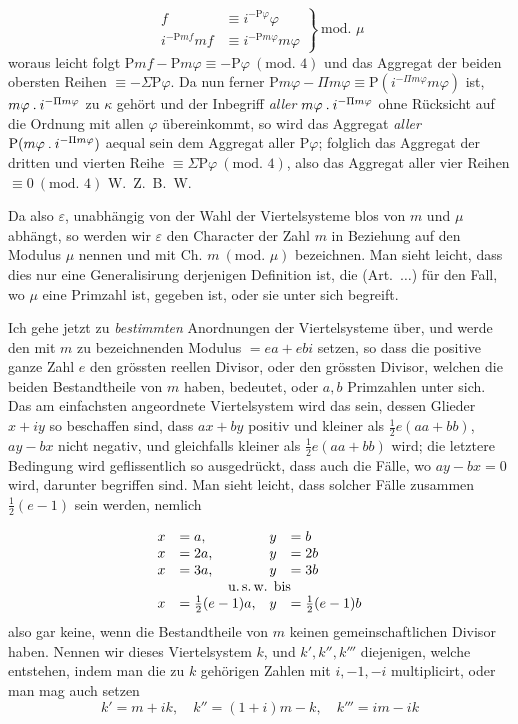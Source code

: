 %
\[
\left.\begin{aligned}
f&\equiv i^{-\mathrm{P}\varphi}\varphi\\
i^{-\mathrm{P}mf}mf&\equiv i^{-\mathrm{P}m\varphi}m\varphi
\end{aligned}\right\}\ \text{mod. }\mu
\]
woraus leicht folgt $\mathrm{P}mf-\mathrm{P}m\varphi\equiv-\mathrm{P}\varphi\ (\text{mod. }4)$ und das Aggregat der beiden obersten Reihen $\equiv-\Sigma\mathrm{P}\varphi$. Da nun ferner $\mathrm{P}m\varphi-\Pi m\varphi\equiv\mathrm{P}(i^{-\Pi m\varphi}m\varphi)$ ist, $m\varphi\mathbin{.} i^{-\Pi m\varphi}$ zu $\kappa$ gehört und der Inbegriff \emph{aller} $m\varphi\mathbin{.} i^{-\Pi m\varphi}$ ohne Rücksicht auf die Ordnung mit allen $\varphi$ übereinkommt, so wird das Aggregat \emph{aller} $\mathrm{P}(m\varphi\mathbin{.} i^{-\Pi m\varphi})$ aequal sein dem Aggregat aller $\mathrm{P}\varphi$; folglich das Aggregat der dritten und vierten Reihe $\equiv\Sigma\mathrm{P}\varphi\ (\text{mod. }4)$, also das Aggregat aller vier Reihen $\equiv0\ (\text{mod. }4)$ W.\ Z.\ B.\ W.

Da also $\varepsilon$, unabhängig von der Wahl der Viertelsysteme blos von $m$ und $\mu$ abhängt, so werden wir $\varepsilon$ den Character der Zahl $m$ in Beziehung auf den Modulus $\mu$ nennen und mit $\text{Ch. }m\ (\text{mod. }\mu)$ bezeichnen. Man sieht leicht, dass dies nur eine Generalisirung derjenigen Definition ist, die (Art.\ $\ldots$) für den Fall, wo $\mu$ eine Primzahl ist, gegeben ist, oder sie unter sich begreift.

Ich gehe jetzt zu \emph{bestimmten} Anordnungen der Viertelsysteme über, und werde den mit $m$ zu bezeichnenden Modulus $=ea+ebi$ setzen, so dass die positive ganze Zahl $e$ den grössten reellen Divisor, oder den grössten Divisor, welchen die beiden Bestandtheile von $m$ haben, bedeutet, oder $a,b$ Primzahlen unter sich. Das am einfachsten angeordnete Viertelsystem wird das sein, dessen Glieder $x+iy$ so beschaffen sind, dass $ax+by$ positiv und kleiner als $\frac12e(aa+bb)$, $ay-bx$ nicht negativ, und gleichfalls kleiner als $\frac12e(aa+bb)$ wird; die letztere Bedingung wird geflissentlich so ausgedrückt, dass auch die Fälle, wo $ay-bx=0$ wird, darunter begriffen sind. Man sieht leicht, dass solcher Fälle zusammen $\frac12(e-1)$ sein werden, nemlich

\[
\begin{array}{rlrl}
x&=a,&y&=b\\
x&=2a,&y&=2b\\
x&=3a,&y&=3b\\
\multicolumn{4}{c}{\text{u.\,s.\,w. bis}}\\
x&=\frac12(e-1)a,&y&=\frac12(e-1)b
\end{array}
\]
also gar keine, wenn die Bestandtheile von $m$ keinen gemeinschaftlichen Divisor %
%
haben. Nennen wir dieses Viertelsystem $k$, und $k',k'',k'''$ diejenigen, welche entstehen, indem man die zu $k$ gehörigen Zahlen mit $i,-1,-i$ multiplicirt, oder man mag auch setzen
\[
k'=m+ik,\quad k''=(1+i)m-k,\quad k'''=im-ik
\]

